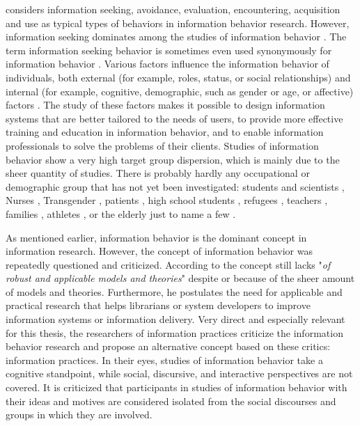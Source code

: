 \documentclass[12pt, a4paper, titlepage, oneside, abstract=true, toc=listof, toc=bibliography, BCOR=1cm]{scrreprt}
\begin{document}
\citet[p. 50]{Ford2015} considers information seeking, avoidance, evaluation, encountering, acquisition and use as typical types of behaviors in information behavior research. However, information seeking dominates among the studies of information behavior \citep{Greifeneder2014}. The term information seeking behavior is sometimes even used synonymously for information behavior \citep[e.g.][]{Urquhart2011}. 
Various factors influence the information behavior of individuals, both external (for example, roles, status, or social relationships) and internal (for example, cognitive, demographic, such as gender or age, or affective) factors \citep [pp. 99ff]{Ford2015}.  The study of these factors makes it possible to design information systems that are better tailored to the needs of users, to provide more effective training and education in information behavior, and to enable information professionals to solve the problems of their clients.
Studies of information behavior show a very high target group dispersion, which is mainly due to the sheer quantity of studies. There is probably hardly any occupational or demographic group that has not yet been investigated: students and scientists \citep[e.g.][]{Campbell2017, Hemminger2007, Rowlands2008}, Nurses \citep{Urquhart1994}, Transgender \citep{Pohjanen2016}, patients \citep{Pettigrew1999}, high school students \citep{Koh2019}, refugees \citep{Hassan2019}, teachers \citep{Diekema2012}, families \citep{Veinot2011}, athletes \citep{Adams2013}, or the elderly \citep{Williamson2009} just to name a few \citep[see ][p. 277ff, for an overview of different groups or roles in  information behavior research]{Case2016}. 

As mentioned earlier, information behavior is the dominant concept in information research. However, the concept of information behavior was repeatedly questioned and criticized. According to \citet[p. 238]{Ford2015} the concept still lacks "\textit{of robust and applicable models and theories}" despite or because of the sheer amount of models and theories. Furthermore, he postulates the need for applicable and practical research that helps librarians or system developers to improve information systems or information delivery. Very direct and especially relevant for this thesis, the researchers of information practices criticize the information behavior research \citep[p. 116ff]{Savolainen2006} and propose an alternative concept based on these critics: information practices. In their eyes, studies of information behavior take a cognitive standpoint, while social, discursive, and interactive perspectives are not covered. It is criticized that participants in studies of information behavior with their ideas and motives are considered isolated from the social discourses and groups in which they are involved. 
\end{document}
